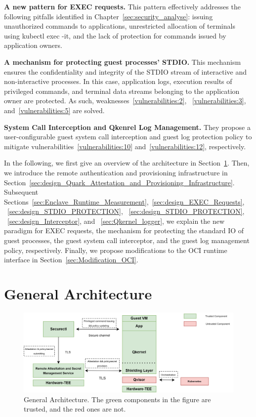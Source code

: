 \textbf{A new pattern for EXEC requests.} This pattern effectively addresses the following pitfalls identified in Chapter~\ref{sec:security_analyse}: issuing unauthorized commands to applications, unrestricted allocation of terminals using kubectl exec -it, and the lack of protection for commands issued by application owners.

\textbf{A mechanism for protecting guest processes' STDIO.} This mechanism ensures the confidentiality and integrity of the STDIO stream of interactive and non-interactive processes. In this case, application logs, execution results of privileged commands, and terminal data streams belonging to the application owner are protected. As such, weaknesses~\ref{vulnerabilities:2}, ~\ref{vulnerabilities:3}, and~\ref{vulnerabilities:5} are solved.

\textbf{System Call Interception and Qkenrel Log Management.} They propose a user-configurable guest system call interception and guest log protection policy to mitigate vulnerabilities~\ref{vulnerabilities:10} and~\ref{vulnerabilities:12}, respectively.
 
In the following, we first give an overview of the architecture in Section~\ref{sec:General_Architecture}. Then, we introduce the remote authentication and provisioning infrastructure in Section~\ref{sec:design_Quark_Attestation_and_Provisioning_Infrastructure}. Subsequent Sections~\ref{sec:Enclave_Runtime_Measurement},~\ref{sec:design_EXEC_Requests},
~\ref{sec:design_STDIO_PROTECTION}, ~\ref{sec:design_STDIO_PROTECTION}, ~\ref{sec:design_Interceptor}, and ~\ref{sec:Qkernel_logger}, we explain the new paradigm for EXEC requests, the 
mechanism for protecting the standard IO of guest processes, the guest system call interceptor, and the guest log management policy, respectively. Finally, we propose modifications to the OCI runtime interface in Section~\ref{sec:Modification_OCI}.


\section{General Architecture}
\label{sec:General_Architecture}
\begin{figure}[!htb]
    \centering
    \includegraphics[height=0.3\textheight, width=1\textwidth]{images/genaral_architechture.png}
    \caption[General Architecture]{General Architecture. The green components in the figure are trusted, and the red ones are not.}
    \label{fig:genaral_architechture}
\end{figure}

